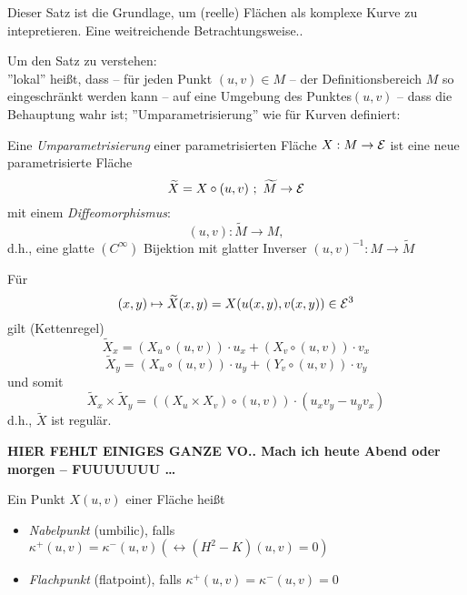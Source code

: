 \begin{remark}
	
	Dieser Satz ist die Grundlage, um (reelle) Flächen als komplexe Kurve zu intepretieren. Eine weitreichende Betrachtungsweise..
\end{remark}

\begin{remark}
	
	Um den Satz zu verstehen:\\
	''lokal'' heißt, dass -- für jeden Punkt $ (u,v) \in M $ -- der Definitionsbereich $M$ so eingeschränkt werden kann -- auf eine Umgebung des Punktes$ (u,v) $ -- dass die Behauptung wahr ist;
	''Umparametrisierung'' wie für Kurven definiert:
\end{remark}

\begin{definition}
	
	Eine \emph{Umparametrisierung} einer parametrisierten Fläche $ X: M \rightarrow \mathcal E $ ist eine neue parametrisierte Fläche \[ \widetilde{X}=X\circ(u,v)~;~ \widetilde{M} \rightarrow \mathcal E \]
	mit einem \emph{Diffeomorphismus}: \[ (u,v): \widetilde{M} \rightarrow M, \] d.h., eine glatte $ (C^\infty) $ Bijektion mit glatter Inverser $ (u,v)^{-1}:M \rightarrow \widetilde{M} $
		
\end{definition}

\begin{remark}
	
	Für \[(x,y)\mapsto \widetilde{X}(x,y) = X(u(x,y),v(x,y)) \in \mathcal E^3  \] gilt (Kettenregel) \[ \widetilde{X}_x = (X_u\circ (u,v))\cdot u_x + (X_v \circ (u,v)) \cdot v_x \]
	\[ \widetilde{X}_y = (X_u \circ (u,v))\cdot u_y + (Y_v \circ (u,v)) \cdot v_y \]
	und somit 
	\[ \widetilde{X}_x \times \widetilde{X}_y = ((X_u\times X_v)\circ (u,v))\cdot (u_xv_y - u_yv_x) \] d.h., $ \widetilde{X} $ ist regulär.
	
\end{remark}



\textbf{HIER FEHLT EINIGES  GANZE VO.. Mach ich heute Abend oder morgen -- FUUUUUUU \dots}

\begin{definition}
	
	Ein Punkt $X(u,v)$ einer Fläche heißt 
	\begin{itemize}
		
		\item \emph{Nabelpunkt} (umbilic), falls $\kappa^+(u,v) = \kappa^-(u,v) (\leftrightarrow (H^2- K)(u,v)=0) $
		\item \emph{Flachpunkt} (flatpoint), falls $\kappa^+(u,v) = \kappa^-(u,v)=0$
		
	\end{itemize}

	
\end{definition}

